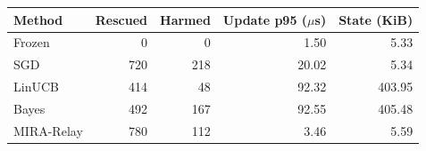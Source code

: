\begin{tabular}{lrrrr}
\toprule
Method & Rescued & Harmed & Update p95 ($\mu$s) & State (KiB) \\
\midrule
Frozen & 0 & 0 & 1.50 & 5.33 \\
SGD & 720 & 218 & 20.02 & 5.34 \\
LinUCB & 414 & 48 & 92.32 & 403.95 \\
Bayes & 492 & 167 & 92.55 & 405.48 \\
MIRA-Relay & 780 & 112 & 3.46 & 5.59 \\
\bottomrule
\end{tabular}
